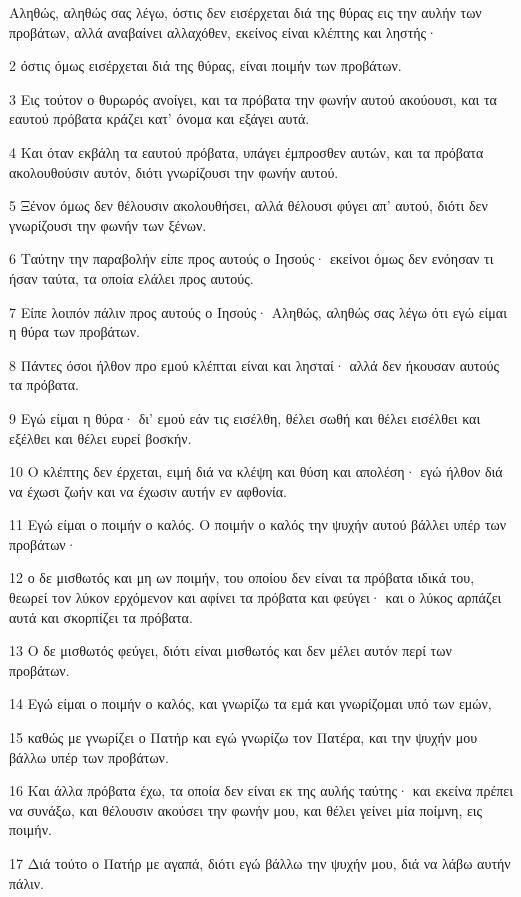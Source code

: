 \par Αληθώς, αληθώς σας λέγω, όστις δεν εισέρχεται διά της θύρας εις την αυλήν των προβάτων, αλλά αναβαίνει αλλαχόθεν, εκείνος είναι κλέπτης και ληστής·
\par 2 όστις όμως εισέρχεται διά της θύρας, είναι ποιμήν των προβάτων.
\par 3 Εις τούτον ο θυρωρός ανοίγει, και τα πρόβατα την φωνήν αυτού ακούουσι, και τα εαυτού πρόβατα κράζει κατ' όνομα και εξάγει αυτά.
\par 4 Και όταν εκβάλη τα εαυτού πρόβατα, υπάγει έμπροσθεν αυτών, και τα πρόβατα ακολουθούσιν αυτόν, διότι γνωρίζουσι την φωνήν αυτού.
\par 5 Ξένον όμως δεν θέλουσιν ακολουθήσει, αλλά θέλουσι φύγει απ' αυτού, διότι δεν γνωρίζουσι την φωνήν των ξένων.
\par 6 Ταύτην την παραβολήν είπε προς αυτούς ο Ιησούς· εκείνοι όμως δεν ενόησαν τι ήσαν ταύτα, τα οποία ελάλει προς αυτούς.
\par 7 Είπε λοιπόν πάλιν προς αυτούς ο Ιησούς· Αληθώς, αληθώς σας λέγω ότι εγώ είμαι η θύρα των προβάτων.
\par 8 Πάντες όσοι ήλθον προ εμού κλέπται είναι και λησταί· αλλά δεν ήκουσαν αυτούς τα πρόβατα.
\par 9 Εγώ είμαι η θύρα· δι' εμού εάν τις εισέλθη, θέλει σωθή και θέλει εισέλθει και εξέλθει και θέλει ευρεί βοσκήν.
\par 10 Ο κλέπτης δεν έρχεται, ειμή διά να κλέψη και θύση και απολέση· εγώ ήλθον διά να έχωσι ζωήν και να έχωσιν αυτήν εν αφθονία.
\par 11 Εγώ είμαι ο ποιμήν ο καλός. Ο ποιμήν ο καλός την ψυχήν αυτού βάλλει υπέρ των προβάτων·
\par 12 ο δε μισθωτός και μη ων ποιμήν, του οποίου δεν είναι τα πρόβατα ιδικά του, θεωρεί τον λύκον ερχόμενον και αφίνει τα πρόβατα και φεύγει· και ο λύκος αρπάζει αυτά και σκορπίζει τα πρόβατα.
\par 13 Ο δε μισθωτός φεύγει, διότι είναι μισθωτός και δεν μέλει αυτόν περί των προβάτων.
\par 14 Εγώ είμαι ο ποιμήν ο καλός, και γνωρίζω τα εμά και γνωρίζομαι υπό των εμών,
\par 15 καθώς με γνωρίζει ο Πατήρ και εγώ γνωρίζω τον Πατέρα, και την ψυχήν μου βάλλω υπέρ των προβάτων.
\par 16 Και άλλα πρόβατα έχω, τα οποία δεν είναι εκ της αυλής ταύτης· και εκείνα πρέπει να συνάξω, και θέλουσιν ακούσει την φωνήν μου, και θέλει γείνει μία ποίμνη, εις ποιμήν.
\par 17 Διά τούτο ο Πατήρ με αγαπά, διότι εγώ βάλλω την ψυχήν μου, διά να λάβω αυτήν πάλιν.
